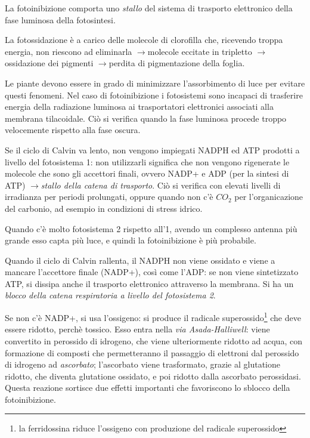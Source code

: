\documentclass[a4paper,12pt]{book}
\newcommand{\lfreccia}{\ensuremath{\longrightarrow}}
\begin{document}
 La fotoinibizione comporta uno \emph{stallo} del sistema di trasporto elettronico della fase luminosa della fotosintesi. 
 
 La fotossidazione è a carico delle molecole di clorofilla che, ricevendo troppa energia, non riescono ad eliminarla \lfreccia molecole eccitate in tripletto \lfreccia ossidazione dei pigmenti \lfreccia perdita di pigmentazione della foglia.
 
Le piante devono essere in grado di minimizzare l'assorbimento di luce per evitare questi fenomeni.
Nel caso di fotoinibizione i fotosistemi sono incapaci di trasferire energia della radiazione luminosa ai trasportatori elettronici associati alla membrana tilacoidale. Ciò si verifica quando la fase luminosa procede troppo velocemente rispetto alla fase oscura.

Se il ciclo di Calvin va lento, non vengono impiegati NADPH ed ATP prodotti a livello del fotosistema 1: non utilizzarli significa che non vengono rigenerate le molecole che sono gli accettori finali, ovvero NADP+ e ADP (per la sintesi di ATP) \lfreccia \emph{stallo della catena di trasporto}. Ciò si verifica con elevati livelli di irradianza per periodi prolungati, oppure quando non c'è $CO_{2}$ per l'organicazione del carbonio, ad esempio in condizioni di stress idrico.

Quando c'è molto fotosistema 2 rispetto all'1, avendo un complesso antenna più grande esso capta più luce, e quindi la fotoinibizione è più probabile.

Quando il ciclo di Calvin rallenta, il NADPH non viene ossidato e viene a mancare l'accettore finale (NADP+), così come l'ADP: se non viene sintetizzato ATP, si dissipa anche il trasporto elettronico attraverso la membrana. Si ha un \emph{blocco della catena respiratoria a livello del fotosistema 2}.

Se non c'è NADP+, si usa l'ossigeno: si produce il radicale superossido\footnote{la ferridossina riduce l'ossigeno con produzione del radicale superossido} che deve essere ridotto, perchè tossico. Esso entra nella \emph{via Asada-Halliwell}: viene convertito in perossido di idrogeno, che viene ulteriormente ridotto ad acqua, con formazione di composti che permetteranno il passaggio di elettroni dal perossido di idrogeno ad \emph{ascorbato}; l'ascorbato viene trasformato, grazie al glutatione ridotto, che diventa glutatione ossidato, e poi ridotto dalla ascorbato perossidasi. Questa reazione sortisce due effetti importanti che favoriscono lo sblocco della fotoinibizione.
\end{document}
